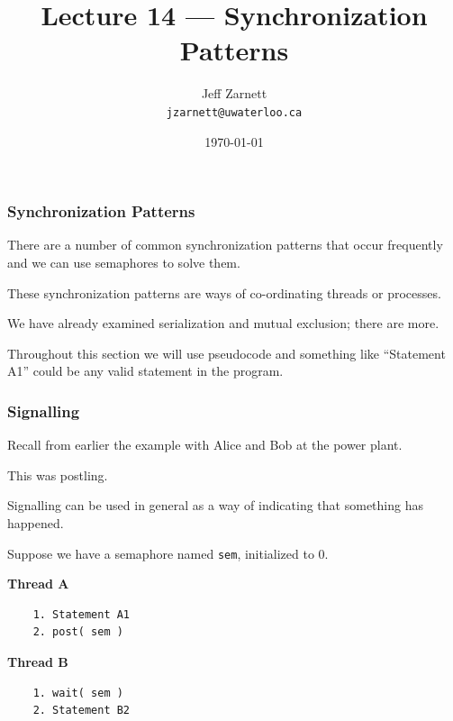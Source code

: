 

\title{Lecture 14 --- Synchronization Patterns }

\author{Jeff Zarnett \\ \small \texttt{jzarnett@uwaterloo.ca}}
\date{\today}




\begin{frame}
  \titlepage

 \end{frame}

\begin{frame}
\frametitle{Synchronization Patterns}


There are a number of common synchronization patterns that occur frequently and we can use semaphores to solve them. 

These synchronization patterns are ways of co-ordinating threads or processes. 

We have already examined serialization and mutual exclusion; there are more. 

Throughout this section we will use pseudocode and something like ``Statement A1'' could be any valid statement in the program.

\end{frame}

\begin{frame}[fragile]
\frametitle{Signalling}

Recall from earlier the example with Alice and Bob at the power plant. 

This was postling.

Signalling can be used in general as a way of indicating that something has happened. 

Suppose we have a semaphore named \texttt{sem}, initialized to 0.

\begin{multicols}{2}
\textbf{Thread A}
  \begin{verbatim}
	1. Statement A1
	2. post( sem )
  \end{verbatim}
\columnbreak
\textbf{Thread B}
  \begin{verbatim}
	1. wait( sem )
	2. Statement B2
  \end{verbatim}
\end{multicols}
\vspace{-2em}


\end{frame}

